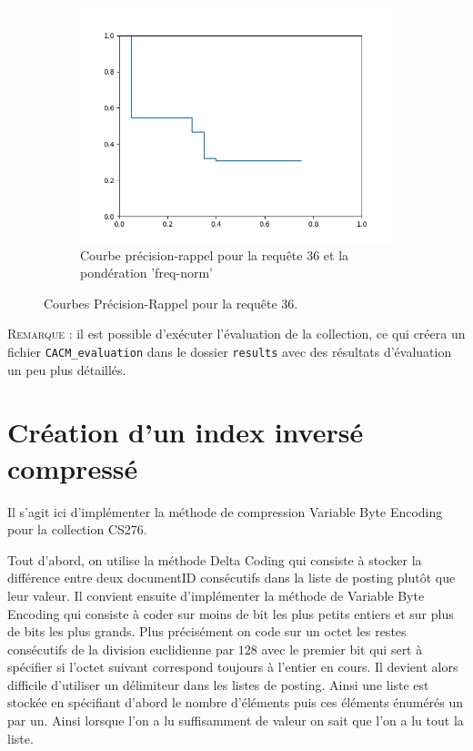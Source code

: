 \documentclass[12pt,a4paper]{article}
\begin{document}
\begin{figure}[htbp]
\begin{subfigure}[b]{0.27\textwidth}
	\centering \includegraphics[width=\textwidth]{36_freq_norm.png}
	\caption{Courbe précision-rappel pour la requête $36$ et la pondération 'freq-norm'}
	\label{fig:precision-recall-3}
	\end{subfigure}

\caption{Courbes Précision-Rappel pour la requête 36.}
\label{fig:precision-recall}
\end{figure}

\noindent \textsc{Remarque} : il est possible d'exécuter l'évaluation de la collection, ce qui créera un fichier \texttt{CACM\_evaluation} dans le dossier \texttt{results} avec des résultats d'évaluation un peu plus détaillés.

\section{Création d’un index inversé compressé}
Il s'agit ici d'implémenter la méthode de compression Variable Byte Encoding pour la collection CS276.

Tout d'abord, on utilise la méthode Delta Coding qui consiste à stocker la différence entre deux documentID consécutifs dans la liste de posting plutôt que leur valeur. Il convient ensuite d'implémenter la méthode de Variable Byte Encoding qui consiste à coder sur moins de bit les plus petits entiers et sur plus de bits les plus grands. Plus précisément on code sur un octet les restes consécutifs de la division euclidienne par $128$ avec le premier bit qui sert à spécifier si l'octet suivant correspond toujours à l'entier en cours. Il devient alors difficile d'utiliser un délimiteur dans les listes de posting. Ainsi une liste est stockée en spécifiant d'abord le nombre d'éléments puis ces éléments énumérés un par un. Ainsi lorsque l'on a lu suffisamment de valeur on sait que l'on a lu tout la liste.
\end{document}
